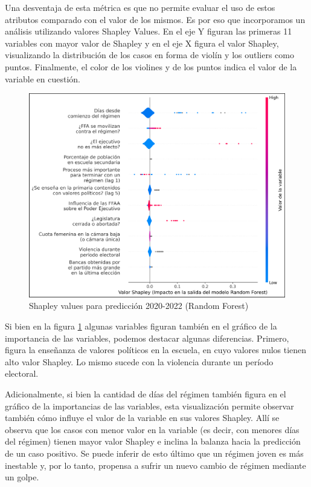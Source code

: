 \documentclass{article}
\begin{document}
Una desventaja de esta métrica es que no permite evaluar el uso de estos atributos comparado con el valor
de los mismos. Es por eso que incorporamos un análisis utilizando valores Shapley Values. En el eje Y 
figuran las primeras 11 variables con mayor valor de Shapley y en el eje X figura el valor Shapley, 
visualizando la distribución de los casos en forma de violín y los outliers como puntos. Finalmente, 
el color de los violines y de los puntos indica el valor de la variable en cuestión.

\begin{figure}[H]
  \centering
  \includegraphics[width=1\textwidth]{9_shapley_values_rf.png}
  \caption{Shapley values para predicción 2020-2022 (Random Forest)\label{fig:shapley_rf}}
\end{figure}

Si bien en la figura \ref{fig:shapley_rf} algunas variables figuran también en el gráfico de la 
importancia de las variables, podemos destacar algunas diferencias. Primero, figura la enseñanza de 
valores políticos en la escuela, en cuyo valores nulos tienen alto valor Shapley. Lo mismo sucede
con la violencia durante un período electoral. %

Adicionalmente, si bien la cantidad de días del régimen también figura en el gráfico de la 
importancias de las variables, esta visualización permite observar también cómo influye el valor
de la variable en sus valores Shapley. Allí se observa que los casos con menor valor en la variable 
(es decir, con menores días del régimen) tienen mayor valor Shapley e inclina la balanza hacia la 
predicción de un caso positivo. Se puede inferir de esto último que un régimen joven es más 
inestable y, por lo tanto, propensa a sufrir un nuevo cambio de régimen mediante un golpe.
\end{document}
